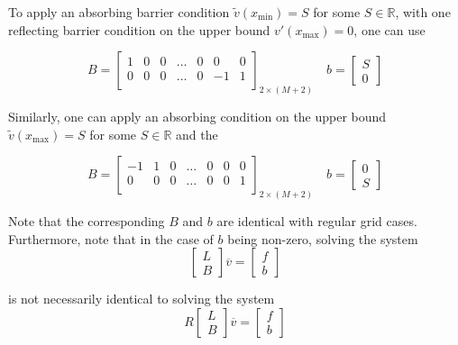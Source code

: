 \documentclass[11pt]{article}
\theoremstyle{definition}
\begin{document}
To apply an absorbing barrier condition $\tilde{v}(x_{\min}) =S$ for some $S \in \mathbb{R}$, with one reflecting barrier condition on the upper bound $v'(x_{\max}) = 0$, one can use

\begin{equation}\label{eq:absorbing-barrier-matrix}
B = \begin{bmatrix}
1 & 0 & 0 & \dots & 0 & 0 & 0 \\
0 & 0 & 0 & \dots & 0 & -1 & 1\\
\end{bmatrix}_{2 \times (M+2)} \quad
b = \begin{bmatrix}
S \\
0
\end{bmatrix}
\end{equation}

Similarly, one can apply an absorbing condition on the upper bound  $\tilde{v}(x_{\max}) =S$ for some $S \in \mathbb{R}$ and the


\begin{equation}\label{eq:absorbing-barrier-matrix-ub}
B = \begin{bmatrix}
-1 & 1 & 0 & \dots & 0 & 0 & 0 \\
0 & 0 & 0 & \dots & 0 & 0 & 1\\
\end{bmatrix}_{2 \times (M+2)} \quad
b = \begin{bmatrix}
0 \\
S
\end{bmatrix}
\end{equation}

Note that the corresponding $B$ and $b$ are identical with regular grid cases. Furthermore, note that in the case of $b$ being non-zero, solving the system 
\begin{equation}
\begin{bmatrix}
 L \\
 B
\end{bmatrix} 
\overline{v}
=
\begin{bmatrix}
f \\
b
\end{bmatrix}
\end{equation}

is not necessarily identical to solving the system
\begin{equation}
R \begin{bmatrix}
 L \\
 B
\end{bmatrix} 
\overline{v}
=
\begin{bmatrix}
f \\
b
\end{bmatrix}
\end{equation}
\end{document}
